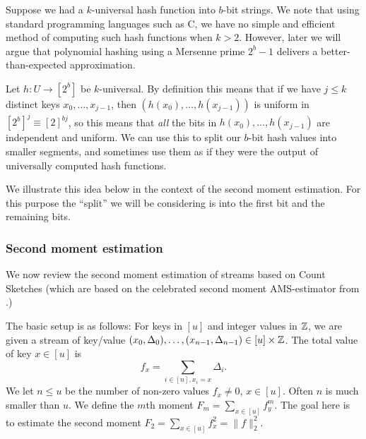Suppose we had a $k$-universal hash function into $b$-bit strings.
We note that using standard programming languages such as C, we have
no simple and efficient method of computing such hash
functions when $k>2$. However, later we will argue that polynomial
hashing using a Mersenne prime $2^b-1$ delivers a better-than-expected
approximation.

Let $h:U\to [2^b]$ be $k$-universal. By definition this
means that if we have $j\leq k$ distinct keys $x_0,\ldots,x_{j - 1}$, then
$(h(x_0),\ldots,h(x_{j - 1}))$ is uniform in $[2^b]^j\equiv [2]^{bj}$,
so this means that \emph{all} the bits in $h(x_0),\ldots,h(x_{j - 1})$ are
independent and uniform. We can use this to split our $b$-bit hash
values into smaller segments, and sometimes use them as if
they were the output of universally computed hash functions.

We illustrate this idea below in the context of the second moment estimation.
For this purpose the ``split'' we will be considering is into the first bit and the remaining bits.

\subsubsection{Second moment estimation}\label{sec:count-sketch}
We now review the second moment estimation of streams based on Count Sketches \cite{charikar04count-sketch} (which are based on the
celebrated second moment AMS-estimator from \cite{alon96frequency}.)

The basic setup is as follows:
For keys in $[u]$ and integer values in $\mathbb Z$, we are given a stream of key/value $(x_0,\Delta_0),\ldots, (x_{n-1},\Delta_{n-1})\in [u]\times\mathbb Z$. The
total value of key $x\in[u]$ is
\[f_x=\sum_{i\in[n],x_i=x} \Delta_i.\]
We let $n\leq u$ be  the number of non-zero values
$f_x\neq 0$, $x\in [u]$. Often $n$ is much smaller than $u$.
We define the $m$th moment $F_m = \sum_{x\in [u]}f_y^m$. The goal here is to
estimate the second moment $F_2 = \sum_{x\in [u]}f_x^2=\|f\|^2_2$.

